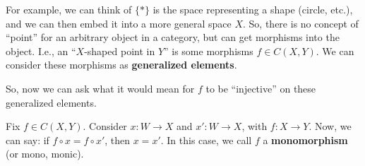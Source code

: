 \documentclass[12pt]{article}
\begin{document}
For example, we can think of $\{\ast\}$ is the space representing a shape (circle, etc.), and we can then embed it into a more general space $X$. So, there is no concept of ``point'' for an arbitrary object in a category, but can get morphisms into the object. I.e., an ``$X$-shaped point in $Y$'' is some morphisms $f \in C(X,Y)$. We can consider these morphisms as \textbf{generalized elements}.

\vspace{5mm}

So, now we can ask what it would mean for $f$ to be ``injective'' on these generalized elements.

\vspace{5mm}

Fix $f \in C(X,Y)$. Consider $x:W \rightarrow X$ and $x':W \rightarrow X$, with $f:X\rightarrow Y$. Now, we can say: if $f \circ x = f \circ x'$, then $x = x'$. In this case, we call $f$ a \textbf{monomorphism} (or mono, monic).
\end{document}

